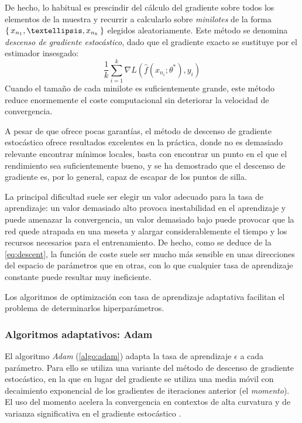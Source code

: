 De hecho, lo habitual es prescindir del cálculo del gradiente sobre todos los elementos de la muestra y recurrir a calcularlo sobre \textit{minilotes} de la forma \( \Set{ x_{n_1}, …, x_{n_k} } \) elegidos aleatoriamente. Este método se denomina \textit{descenso de gradiente estocástico}, dado que el gradiente exacto se sustituye por el estimador insesgado: \[
    \frac{1}{k} \sum_{i = 1}^k \nabla L\left( \widehat{f}(x_{n_i}; \theta^*), y_{i} \right) 
\]
Cuando el tamaño de cada minilote es suficientemente grande, este método reduce enormemente el coste computacional sin deteriorar la velocidad de convergencia.

A pesar de que ofrece pocas garantías, el método de descenso de gradiente estocástico ofrece resultados excelentes en la práctica, donde no es demasiado relevante encontrar mínimos locales, basta con encontrar un punto en el que el rendimiento sea suficientemente bueno, y se ha demostrado que el descenso de gradiente es, por lo general, capaz de escapar de los puntos de silla. 

La principal dificultad suele ser elegir un valor adecuado para la tasa de aprendizaje: un valor demasiado alto provoca inestabilidad en el aprendizaje y puede amenazar la convergencia, un valor demasiado bajo puede provocar que la red quede atrapada en una meseta y alargar considerablemente el tiempo y los recursos necesarios para el entrenamiento. De hecho, como se deduce de la \cref{eq:descent}, la función de coste suele ser mucho más sensible en unas direcciones del espacio de parámetros que en otras, con lo que cualquier tasa de aprendizaje constante puede resultar muy ineficiente.

Los algoritmos de optimización con tasa de aprendizaje adaptativa facilitan el problema de determinarlos hiperparámetros.

\subsubsection{Algoritmos adaptativos: Adam}
El algoritmo \textit{Adam} (\cref{algo:adam}) adapta la tasa de aprendizaje \( \epsilon \) a cada parámetro. Para ello se utiliza una variante del método de descenso de gradiente estocástico, en la que en lugar del gradiente se utiliza una media móvil con decaimiento exponencial de los gradientes de iteraciones anterior (el \textit{momento}). El uso del momento acelera la convergencia en contextos de alta curvatura y de varianza significativa en el gradiente estocástico \cite{polyak1964some}.

